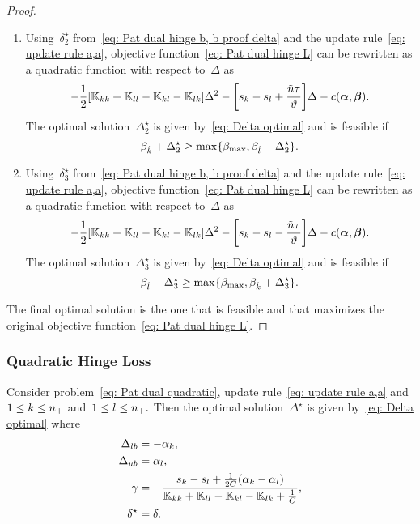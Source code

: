 \begin{proof}
\begin{enumerate}
    \item Using~$\delta^{\star}_2$ from~\eqref{eq: Pat dual hinge b, b proof delta} and the update rule~\eqref{eq: update rule a,a}, objective function~\eqref{eq: Pat dual hinge L} can be rewritten as a quadratic function with respect to~$\Delta$ as
    \begin{equation*}
      - \frac{1}{2} \Brac[s]{\K_{kk} + \K_{ll} - \K_{kl} - \K_{lk}} \Delta^2
      - \Brac[s]{s_k - s_l + \frac{\ntil \tau}{\vartheta}} \Delta
      - c(\bm{\alpha}, \bm{\beta}).
    \end{equation*}
    The optimal solution~$\Delta^{\star}_2$ is given by~\eqref{eq: Delta optimal} and is feasible if
    \begin{equation*}
      \beta_{\hat{k}} + \Delta^{\star}_2 \geq \max\{\beta_{\max} , \beta_{\hat{l}} - \Delta^{\star}_2\}.
    \end{equation*}

    \item Using~$\delta^{\star}_3$ from~\eqref{eq: Pat dual hinge b, b proof delta} and the update rule~\eqref{eq: update rule a,a}, objective function~\eqref{eq: Pat dual hinge L} can be rewritten as a quadratic function with respect to~$\Delta$ as
    \begin{equation*}
      - \frac{1}{2} \Brac[s]{\K_{kk} + \K_{ll} - \K_{kl} - \K_{lk}} \Delta^2
      - \Brac[s]{s_k - s_l - \frac{\ntil \tau}{\vartheta}} \Delta
      - c(\bm{\alpha}, \bm{\beta}).
    \end{equation*}
    The optimal solution~$\Delta^{\star}_3$ is given by~\eqref{eq: Delta optimal} and is feasible if
    \begin{equation*}
      \beta_{\hat{l}} - \Delta^{\star}_3 \geq \max\{\beta_{\max}, \beta_{\hat{k}} + \Delta^{\star}_3\}.
    \end{equation*}
  \end{enumerate}
  The final optimal solution is the one that is feasible and that maximizes the original objective function~\eqref{eq: Pat dual hinge L}.
\end{proof}

\subsubsection{Quadratic Hinge Loss}

\begin{lemma}\label{thm: patmat family quadratic update a,a}
  Consider problem~\eqref{eq: Pat dual quadratic}, update rule~\eqref{eq: update rule a,a} and~$1 \leq k \leq n_{+}$ and~$1 \leq l \leq n_{+}.$ Then the optimal solution~$\Delta^{\star}$ is given by~\eqref{eq: Delta optimal} where
  \begin{align*}
    \Delta_{lb} & = -\alpha_k, \\
    \Delta_{ub} & = \alpha_l, \\
    \gamma & = -\frac{s_k - s_l + \frac{1}{2C}(\alpha_k - \alpha_l)}{\mathbb{K}_{kk} + \mathbb{K}_{ll} - \mathbb{K}_{kl} - \mathbb{K}_{lk} + \frac{1}{C}}, \\
    \delta^{\star}  & = \delta.
  \end{align*}
\end{lemma}

